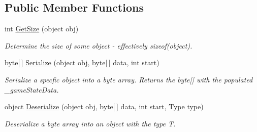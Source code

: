 \subsection*{Public Member Functions}
\begin{DoxyCompactItemize}
\item 
int \hyperlink{class_skyrates_1_1_common_1_1_network_1_1_bit_serialize_attribute_1_1_serialization_module_3_01_t_01_4_a345be6228e06375c239b97e9c4eb17ae}{Get\-Size} (object obj)
\begin{DoxyCompactList}\small\item\em Determine the size of some object -\/ effectively sizeof(object). \end{DoxyCompactList}\item 
byte\mbox{[}$\,$\mbox{]} \hyperlink{class_skyrates_1_1_common_1_1_network_1_1_bit_serialize_attribute_1_1_serialization_module_3_01_t_01_4_a860c0ca332c9d6463cf10085aea7d7da}{Serialize} (object obj, byte\mbox{[}$\,$\mbox{]} data, int start)
\begin{DoxyCompactList}\small\item\em Serialize a specfic object into a byte array. Returns the byte\mbox{[}\mbox{]} with the populated \-\_\-game\-State\-Data. \end{DoxyCompactList}\item 
object \hyperlink{class_skyrates_1_1_common_1_1_network_1_1_bit_serialize_attribute_1_1_serialization_module_3_01_t_01_4_a7e4226cb0b6140e81aeed29d1856d5df}{Deserialize} (object obj, byte\mbox{[}$\,$\mbox{]} data, int start, Type type)
\begin{DoxyCompactList}\small\item\em Deserialize a byte array into an object with the type T. \end{DoxyCompactList}\end{DoxyCompactItemize}
